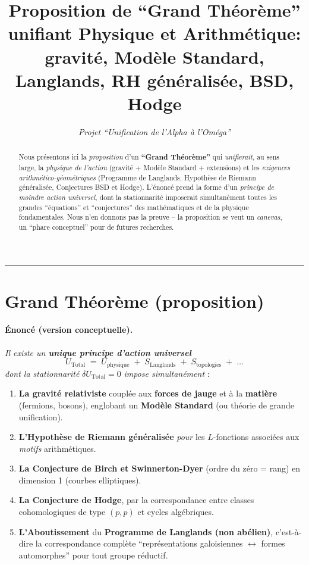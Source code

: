 \documentclass[11pt]{article}
\title{\textbf{Proposition de “Grand Théorème” unifiant Physique et Arithmétique:\\
gravité, Modèle Standard, Langlands, RH généralisée, BSD, Hodge}}
\author{\textit{Projet “Unification de l’Alpha à l’Oméga”}}
\date{}
\begin{document}
\maketitle

\begin{abstract}
Nous présentons ici la \emph{proposition} d'un \textbf{“Grand Théorème”} qui \emph{unifierait}, au sens large, la \emph{physique de l'action} (gravité + Modèle Standard + extensions) et les \emph{exigences arithmético-géométriques} (Programme de Langlands, Hypothèse de Riemann généralisée, Conjectures BSD et Hodge). L'énoncé prend la forme d'un \emph{principe de moindre action universel}, dont la stationnarité imposerait simultanément toutes les grandes “éq\-uations” et “conjectures” des mathématiques et de la physique fondamentales. Nous n'en donnons pas la preuve -- la proposition se veut un \emph{canevas}, un “phare conceptuel” pour de futures recherches.
\end{abstract}

\hrule
\vspace{6pt}

\section*{Grand Théorème (proposition)}

\paragraph{Énoncé (version conceptuelle).}
\emph{Il existe un \textbf{unique principe d'action universel}}
\[
U_{\mathrm{Total}} 
\;=\; 
U_{\mathrm{physique}} 
\;+\;
S_{\mathrm{Langlands}} 
\;+\;
S_{\text{topologies}} 
\;+\;\dots
\]
\emph{dont la stationnarité} 
\(\delta U_{\mathrm{Total}} = 0\) 
\emph{impose simultanément} :

\begin{enumerate}
  \item \textbf{La gravité relativiste} couplée aux \textbf{forces de jauge} et à la \textbf{matière} (fermions, bosons), englobant un \textbf{Modèle Standard} (ou théorie de grande unification).
  \item \textbf{L'Hypothèse de Riemann généralisée} \emph{pour} les $L$-fonctions associées aux \emph{motifs} arithmétiques.
  \item \textbf{La Conjecture de Birch et Swinnerton-Dyer} (ordre du zéro = rang) en dimension 1 (courbes elliptiques).
  \item \textbf{La Conjecture de Hodge}, par la correspondance entre classes cohomologiques de type $(p,p)$ et cycles algébriques.
  \item \textbf{L'Aboutissement} du \textbf{Programme de Langlands (non abélien)}, c'est-à-dire la correspondance complète ``représentations galoisiennes $\leftrightarrow$ formes automorphes'' pour tout groupe réductif.
\end{enumerate}
\end{document}
